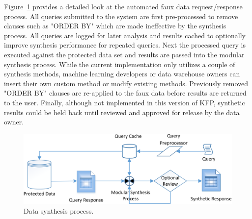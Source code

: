 \documentclass{article}
\begin{document}
Figure~\ref{fig:synthesis_process} provides a detailed look at the automated faux data request/response process. All queries submitted to the system are first pre-processed to remove clauses such as "ORDER BY" which are made ineffective by the synthesis process. All queries are logged for later analysis and results cached to optionally improve synthesis performance for repeated queries. Next the processed query is executed against the protected data set and results are passed into the modular synthesis process. While the current implementation only utilizes a couple of synthesis methods, machine learning developers or data warehouse owners can insert their own custom method or modify existing methods. Previously removed "ORDER BY" clauses are re-applied to the faux data before results are returned to the user. Finally, although not implemented in this version of KFP, synthetic results could be held back until reviewed and approved for release by the data owner.



\begin{figure}[ht]
  \centering
  \includegraphics[width=120mm]{data_synthesis_process}
  \caption{Data synthesis process.}
  \label{fig:synthesis_process}
\end{figure}
\end{document}

